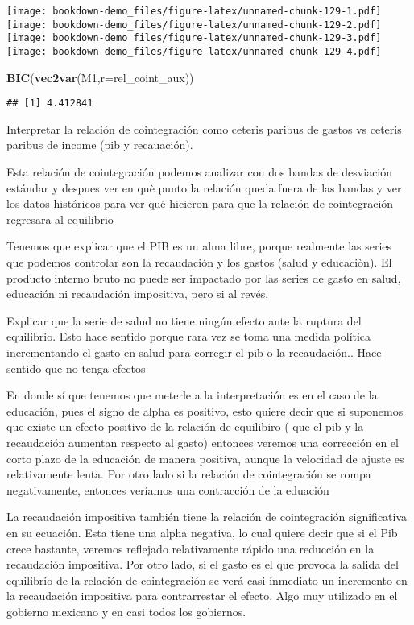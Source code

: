 \documentclass[]{book}
\newenvironment{Shaded}{\begin{snugshade}}{\end{snugshade}}
\newcommand{\KeywordTok}[1]{\textcolor[rgb]{0.13,0.29,0.53}{\textbf{#1}}}
\newcommand{\DataTypeTok}[1]{\textcolor[rgb]{0.13,0.29,0.53}{#1}}
\newcommand{\NormalTok}[1]{#1}
\theoremstyle{definition}
\theoremstyle{definition}
\theoremstyle{definition}
\theoremstyle{remark}
\begin{document}
\texttt{[image: bookdown-demo\_files/figure-latex/unnamed-chunk-129-1.pdf]}
\texttt{[image: bookdown-demo\_files/figure-latex/unnamed-chunk-129-2.pdf]}
\texttt{[image: bookdown-demo\_files/figure-latex/unnamed-chunk-129-3.pdf]}
\texttt{[image: bookdown-demo\_files/figure-latex/unnamed-chunk-129-4.pdf]}

\begin{Shaded}
\begin{Highlighting}[]
\KeywordTok{BIC}\NormalTok{(}\KeywordTok{vec2var}\NormalTok{(M1,}\DataTypeTok{r=}\NormalTok{rel_coint_aux))}
\end{Highlighting}
\end{Shaded}

\begin{verbatim}
## [1] 4.412841
\end{verbatim}

Interpretar la relación de cointegración como ceteris paribus de gastos
vs ceteris paribus de income (pib y recauación).

Esta relación de cointegración podemos analizar con dos bandas de
desviación estándar y despues ver en què punto la relación queda fuera
de las bandas y ver los datos históricos para ver qué hicieron para que
la relación de cointegración regresara al equilibrio

Tenemos que explicar que el PIB es un alma libre, porque realmente las
series que podemos controlar son la recaudación y los gastos (salud y
educaciòn). El producto interno bruto no puede ser impactado por las
series de gasto en salud, educación ni recaudación impositiva, pero si
al revés.

Explicar que la serie de salud no tiene ningún efecto ante la ruptura
del equilibrio. Esto hace sentido porque rara vez se toma una medida
política incrementando el gasto en salud para corregir el pib o la
recaudación.. Hace sentido que no tenga efectos

En donde sí que tenemos que meterle a la interpretación es en el caso de
la educación, pues el signo de alpha es positivo, esto quiere decir que
si suponemos que existe un efecto positivo de la relación de equilibiro
( que el pib y la recaudación aumentan respecto al gasto) entonces
veremos una corrección en el corto plazo de la educación de manera
positiva, aunque la velocidad de ajuste es relativamente lenta. Por otro
lado si la relación de cointegración se rompa negativamente, entonces
veríamos una contracción de la eduación

La recaudación impositiva también tiene la relación de cointegración
significativa en su ecuación. Esta tiene una alpha negativa, lo cual
quiere decir que si el Pib crece bastante, veremos reflejado
relativamente rápido una reducción en la recaudación impositiva. Por
otro lado, si el gasto es el que provoca la salida del equilibrio de la
relación de cointegración se verá casi inmediato un incremento en la
recaudación impositiva para contrarrestar el efecto. Algo muy utilizado
en el gobierno mexicano y en casi todos los gobiernos.
\end{document}
